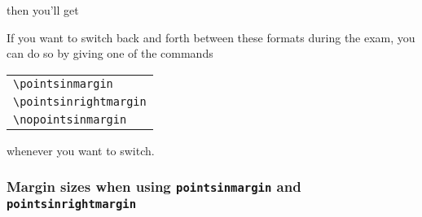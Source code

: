 \documentclass[12pt]{exam}
\begin{document}
then you'll get
\addpoints
\pointsdroppedatright
\bracketedpoints
\begin{questions}
\question
{}
  \leavevmode\unskip\nobreak\hfill
\makeatletter
\makeatother
  \par
\end{questions}
\noaddpoints
\nopointsinmargin
\nobracketedpoints



If you want to switch back and forth between these formats during the
exam, you can do so by giving one of the commands
\begin{center}
  \begin{tabular}{l}
    \verb"\pointsinmargin"\\
    \verb"\pointsinrightmargin"\\
    \verb"\nopointsinmargin"
  \end{tabular}
\end{center}
whenever you want to switch.

\subsubsection{Margin sizes when using \texttt{pointsinmargin} and
  \texttt{pointsinrightmargin}}
\end{document}
